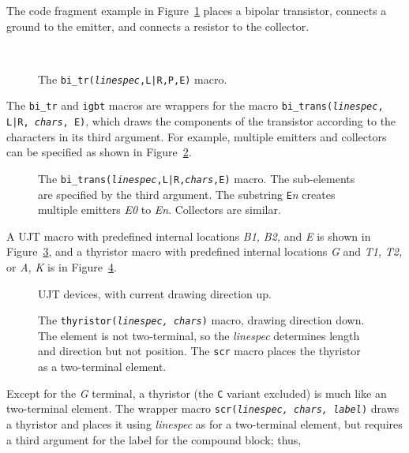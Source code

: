 The code fragment example in Figure~\ref{bitr} places a bipolar transistor,
connects a ground to the emitter, and connects a resistor to the collector.
\begin{figure}[h!]
\vspace*{-\baselineskip}
   \quad\quad\parbox{4in}{\small }%
   \quad\raise-0.4in\hbox{ }%
   \vspace{-\baselineskip}
   \caption{The {\tt bi\_tr({\sl linespec},L|R,P,E)} macro.}
   \label{bitr}
   \end{figure}

The {\tt bi\_tr} and {\tt igbt} macros are wrappers for
the macro {\tt bi\_trans({\sl linespec}, L|R, {\sl chars}, E)}, which
draws the components of the transistor according to the characters in its
third argument.  For example, multiple emitters and collectors can be
specified as shown in Figure~\ref{bi_trans}.
\begin{figure}[h!]
\vspace*{-0.5\baselineskip}
   
   \caption{The {\tt bi\_trans({\sl linespec},L|R,{\sl chars},E)} macro.
   The sub-elements are specified by the third argument.  The substring
   {\tt E}{\sl n} creates multiple emitters {\sl E0} to {\sl En}.
   Collectors are similar.}
   \label{bi_trans}
   \end{figure}

A UJT macro with predefined internal locations {\sl B1,} {\sl B2,}
and {\sl E} is shown in Figure~\ref{ujt},
and a thyristor macro with predefined internal locations
 {\sl G} and {\sl T1,} {\sl T2,} or
 {\sl A,} {\sl K} is in Figure~\ref{thyristor}.
\begin{figure}[h!]
\vspace*{-0.5\baselineskip}
   
   \caption{UJT devices, with current drawing direction up. }
   \label{ujt}
   \end{figure}
\begin{figure}[h!]
\vspace*{-0.5\baselineskip}
   
   \vspace*{-1ex}
   \caption{The {\tt thyristor({\sl linespec, chars})} macro,
    drawing direction down. The element is not two-terminal, so the
    {\sl linespec} determines length and direction but not position.
    The {\tt scr} macro places the thyristor as a two-terminal element.}
   \label{thyristor}
   \end{figure}
Except for the {\sl G} terminal, a thyristor (the {\tt C} variant excluded)
is much like an two-terminal element.  The wrapper macro
{\tt scr({\sl linespec, chars, label})} draws a thyristor and places it
using {\sl linespec} as for a two-terminal element,
but requires a third argument for the label for the compound block; thus,

